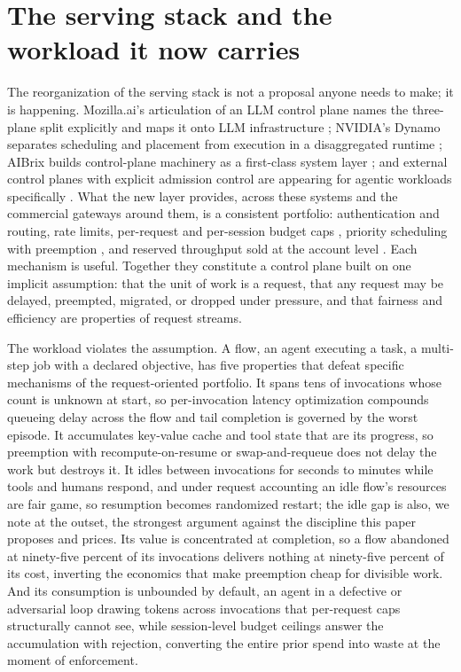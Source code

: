\section{The serving stack and the workload it now carries}

The reorganization of the serving stack is not a proposal anyone needs to
make; it is happening. Mozilla.ai's articulation of an LLM control plane
names the three-plane split explicitly and maps it onto LLM
infrastructure \citep{mozilla2026}; NVIDIA's Dynamo separates scheduling and
placement from execution in a disaggregated runtime \citep{dynamo2025}; AIBrix
builds control-plane machinery as a first-class system layer
\citep{aibrix2025}; and external control planes with explicit admission control
are appearing for agentic workloads specifically \citep{mars2026}. What the new
layer provides, across these systems and the commercial gateways around
them, is a consistent portfolio: authentication and routing, rate limits,
per-request and per-session budget caps \citep{litellm2026,truefoundry2026},
priority scheduling with preemption \citep{vllm2023}, and reserved throughput
sold at the account level \citep{bedrock_ptu,azure_ptu}. Each mechanism is
useful. Together they constitute a control plane built on one implicit
assumption: that the unit of work is a request, that any request may be
delayed, preempted, migrated, or dropped under pressure, and that
fairness and efficiency are properties of request streams.

The workload violates the assumption. A flow, an agent executing a task,
a multi-step job with a declared objective, has five properties that
defeat specific mechanisms of the request-oriented portfolio. It spans
tens of invocations whose count is unknown at start, so per-invocation
latency optimization compounds queueing delay across the flow and tail
completion is governed by the worst episode. It accumulates key-value
cache and tool state that are its progress, so preemption with
recompute-on-resume or swap-and-requeue does not delay the work but
destroys it. It idles between invocations for seconds to minutes while
tools and humans respond, and under request accounting an idle flow's
resources are fair game, so resumption becomes randomized restart; the
idle gap is also, we note at the outset, the strongest argument against
the discipline this paper proposes and prices. Its value is concentrated
at completion, so a flow abandoned at ninety-five percent of its
invocations delivers nothing at ninety-five percent of its cost,
inverting the economics that make preemption cheap for divisible work.
And its consumption is unbounded by default, an agent in a defective or
adversarial loop drawing tokens across invocations that per-request caps
structurally cannot see, while session-level budget ceilings
\citep{litellm2026,truefoundry2026} answer the accumulation with rejection,
converting the entire prior spend into waste at the moment of
enforcement.


